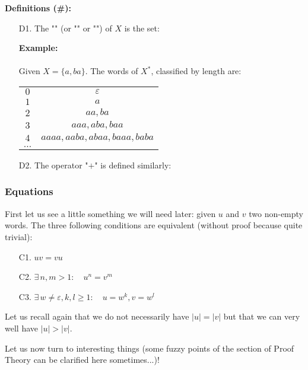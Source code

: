	\textbf{Definitions (\#\mydef):}
	\begin{enumerate}
		\item[D1.] The "\index{}" (or "" or "") of $X$ is the set:
		
		\begin{tcolorbox}[colframe=black,colback=white,sharp corners]
		\textbf{{\Large {}}Example:}\\\\
		Given $X=\{a,ba\}$. The words of $X^{*}$, classified by length are:
		\begin{table}[H]
		\begin{tabular}{cc}
		$0$      & $\varepsilon$              \\
		$1$      & $a$                        \\
		$2$      & $aa,ba$                    \\
		$3$      & $aaa,aba,baa$              \\
		$4$      & $aaaa,aaba,abaa,baaa,baba$ \\
		$\ldots$ &                           
		\end{tabular}
		\end{table}
		\end{tcolorbox}
	
		\item[D2.] The operator "$+$" is defined similarly:
		
	\end{enumerate}
	
	
	\subsubsection{Equations}
	First let us see a little something we will need later: given $u$ and $v$ two non-empty words. The three following conditions are equivalent (without proof because quite trivial):
	\begin{enumerate}
		\item[C1.] $uv=vu$
		\item[C2.] $\exists\, n,m>1:\quad u^n=v^m$
		\item[C3.] $\exists\, w\neq\varepsilon, k,l\ge 1:\quad u=w^k,v=w^l$ 
	\end{enumerate}
	\begin{tcolorbox}[title=Remark,colframe=black,arc=10pt]
	Let us recall again that we do not necessarily have $|u|=|v|$ but that we can very well have $|u|>|v|$.
	\end{tcolorbox}
	Let us now turn to interesting things (some fuzzy points of the section of Proof Theory can be clarified here sometimes...)!
	
